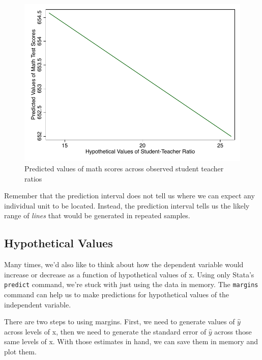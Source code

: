 \documentclass[12pt]{article}
\begin{document}
\begin{figure}
  \centering
  \caption{Predicted values of math scores across observed student
    teacher ratios}
\includegraphics{basic_predict}
\end{figure}

Remember that the prediction interval does not tell us where we can
expect any individual unit to be located. Instead, the prediction
interval tells us the likely range of \emph{lines} that would be
generated in repeated samples. 

\subsection{Hypothetical Values}
\label{sec:hypothetical-values}

Many times, we'd also like to think about how the dependent variable
would increase or decrease as a function of hypothetical values of x.
Using only Stata's \texttt{predict} command, we're stuck with just
using the data in memory. The \texttt{margins} command can help us to
make predictions for hypothetical values of the independent variable. 

There are two steps to using margins. First, we need to generate
values of $\hat{y}$ across levels of x, then we need to generate the
standard error of $\hat{y}$ across those same levels of x. With those
estimates in hand, we can save them in memory and plot them. 
\end{document}
